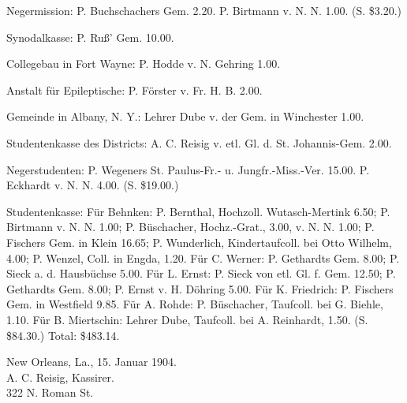Negermission: P. Buchschachers Gem. 2.20. P. Birtmann v. N. N. 1.00. (S. \$3.20.)

Synodalkasse: P. Ruß’ Gem. 10.00.

Collegebau in Fort Wayne: P. Hodde v. N. Gehring 1.00.

Anstalt für Epileptische: P. Förster v. Fr. H. B. 2.00.

Gemeinde in Albany, N. Y.: Lehrer Dube v. der Gem. in Winchester 1.00.

Studentenkasse des Districts: A. C. Reisig v. etl. Gl. d. St. Johannis-Gem. 2.00.

Negerstudenten: P. Wegeners St. Paulus-Fr.- u. Jungfr.-Miss.-Ver. 15.00. P. Eckhardt v. N. N. 4.00. (S. \$19.00.)

Studentenkasse: Für Behnken: P. Bernthal, Hochzoll. Wutasch-Mertink 6.50; P. Birtmann v. N. N. 1.00; P. Büschacher, Hochz.-Grat., 3.00, v. N. N. 1.00; P. Fischers Gem. in Klein 16.65; P. Wunderlich, Kindertaufcoll. bei Otto Wilhelm, 4.00; P. Wenzel, Coll. in Engda, 1.20. Für C. Werner: P. Gethardts Gem. 8.00; P. Sieck a. d. Hausbüchse 5.00. Für L. Ernst: P. Sieck von etl. Gl. f. Gem. 12.50; P. Gethardts Gem. 8.00; P. Ernst v. H. Döhring 5.00. Für K. Friedrich: P. Fischers Gem. in Westfield 9.85. Für A. Rohde: P. Büschacher, Taufcoll. bei G. Biehle, 1.10. Für B. Miertschin: Lehrer Dube, Taufcoll. bei A. Reinhardt, 1.50. (S. \$84.30.) Total: \$483.14.

\begin{unterschrift}
New Orleans, La., 15. Januar 1904.\\
A. C. Reisig, Kassirer.\\
322 N. Roman St.
\end{unterschrift}
